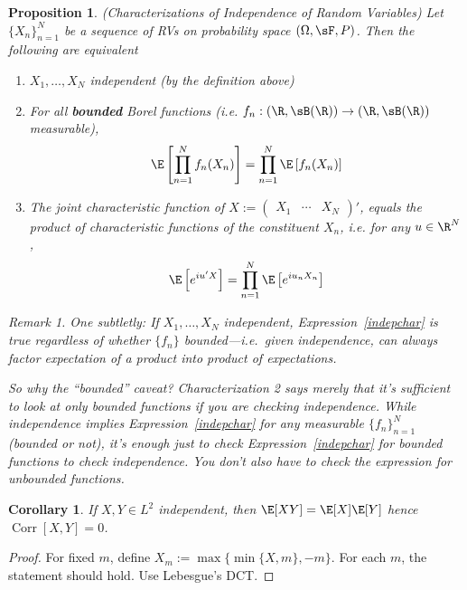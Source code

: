 \documentclass[12pt]{article}
\theoremstyle{plain}
\newtheorem{prop}[thm]{Proposition}
\newtheorem{cor}[thm]{Corollary}
\theoremstyle{definition}
\theoremstyle{remark}
\newtheorem*{rmk}{Remark}
\newcommand{\ra}{\rightarrow}
\newcommand{\Corr}{\operatorname{Corr}}
\newcommand{\nN}{_{n=1}^N}
\begin{document}
\begin{prop}\emph{(Characterizations of Independence of Random Variables)}
\label{prop:indep}
Let $\{X_n\}\nN$ be a sequence of RVs on probability space
$(\Omega,\sF,P)$. Then the following are equivalent
\begin{enumerate}
  \item $X_1,\ldots,X_N$ independent (by the definition above)
  \item For all \textbf{bounded} Borel functions (i.e.
    $f_n:(\R,\sB(\R)) \ra (\R,\sB(\R))$ measurable),
    \begin{align}
      \E\left[\prod\nN f_n(X_n)\right]
      =
      \prod\nN \E\left[f_n(X_n)\right]
      \label{indepchar}
    \end{align}
  \item
    The joint characteristic function of
    $X := \begin{pmatrix} X_1 &\cdots & X_N \end{pmatrix}'$,
    equals the product of characteristic functions of the constituent
    $X_n$, i.e. for any $u\in \R^N$,
    \begin{align*}
      \E\left[e^{iu' X}\right]
      =
      \prod\nN \E\left[e^{iu_n X_n}\right]
    \end{align*}
\end{enumerate}
\begin{rmk}
One subtletly:
If $X_1,\ldots,X_N$ independent, Expression~\ref{indepchar} is true
\emph{regardless} of whether $\{f_n\}$ bounded---i.e.\
given independence, can \emph{always} factor expectation of a product
into product of expectations.

So why the ``bounded'' caveat? Characterization 2 says merely that it's
\emph{sufficient} to look at only bounded functions if you are
\emph{checking} independence. While independence \emph{implies}
Expression~\ref{indepchar} for any measurable $\{f_n\}\nN$
(bounded or not), it's \emph{enough} just to check
Expression~\ref{indepchar} for bounded functions to check
independence. You don't also have to check the expression
for unbounded functions.
\end{rmk}
\end{prop}
\begin{cor}
If $X,Y\in L^2$ independent, then
$\E[XY] = \E[X]\E[Y]$ hence
$\Corr[X,Y] = 0$.
\end{cor}
\begin{proof}
For fixed $m$, define
$X_m := \max\{\min\{X,m\}, -m\}$.
For each $m$, the statement should hold. Use Lebesgue's DCT.
\end{proof}
\end{document}
